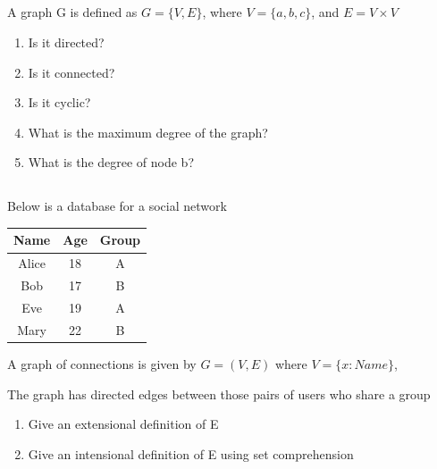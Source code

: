 \documentclass[twocolumn]{article}
\begin{document}
\subsection{}

    A graph G is defined as $G = \{V, E\}$, where $V = \{ a, b, c \}$, and $E = V \times V$

    \begin{enumerate}
        \item Is it directed?
        \item Is it connected?
        \item Is it cyclic?
        \item What is the maximum degree of the graph?
        \item What is the degree of node b?
    \end{enumerate}

\subsection{}

    Below is a database for a social network

    \begin{table}[h!]
        \centering
        \begin{tabular}{c | c | c }
            \toprule
            Name & Age & Group \\
            \midrule
            Alice & 18 & A  \\
            Bob & 17 & B  \\
            Eve & 19 & A \\
            Mary & 22 & B \\
            \bottomrule
        \end{tabular}
    \end{table}

    A graph of connections is given by $ G = ( V, E)$ where $ V = \{ x : Name \}$, %

    The graph has directed edges between those pairs of users who share a group

    \begin{enumerate}
        \item Give an extensional definition of E
        \item Give an intensional definition of E using set comprehension
    \end{enumerate}
\end{document}
